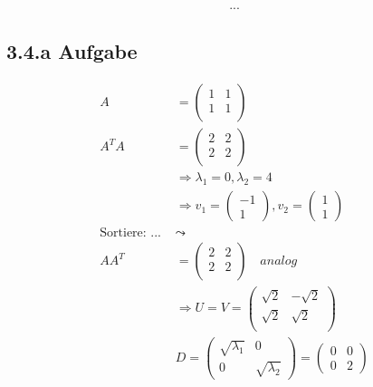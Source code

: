 \begin{equation}\begin{split}
	...
\end{split}\end{equation}

\subsection*{3.4.a Aufgabe}

\begin{equation}\begin{split}
    A 
    &= 
    \begin{pmatrix}
    	1&1\\
    	1&1\\
    \end{pmatrix}\\
    A^TA 
    &= 
	\begin{pmatrix}
		2&2\\
		2&2\\
	\end{pmatrix}\\
	&\Rightarrow \lambda_1 = 0, \lambda_2 = 4\\
    &\Rightarrow v_1 = \begin{pmatrix}-1\\1\end{pmatrix}, v_2 = \begin{pmatrix}1\\1\end{pmatrix}\\
    \text{Sortiere: ... }&\leadsto\\
    AA^T 
    &= 
	\begin{pmatrix}
		2&2\\
		2&2\\
	\end{pmatrix} \quad analog\\
	&\Rightarrow
	U = V 
	=
	\begin{pmatrix}
		\sqrt{2}&-\sqrt{2}\\
		 \sqrt{2}&\sqrt{2}\\
	\end{pmatrix}\\
	&D 
	=
	 \begin{pmatrix}
		\sqrt{\lambda_1}& 0 \\
		0 & \sqrt{\lambda_2}
	\end{pmatrix}
	=
	\begin{pmatrix}
		0&0\\
		0&2
	\end{pmatrix}\\

\end{split}
\end{equation}
